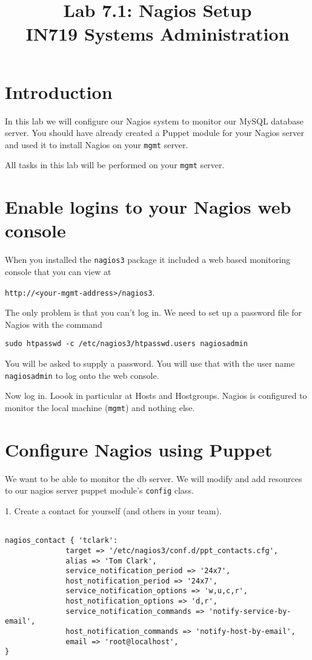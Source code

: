 \documentclass{article}         %
\title{Lab 7.1:  Nagios Setup\\ IN719 Systems Administration}
\date{}                                                 %
\begin{document}
\maketitle

\section*{Introduction}
In this lab we will configure our Nagios system to monitor our MySQL
database server.  You should have already created a Puppet module
for your Nagios server and used it to install Nagios on your 
\texttt{mgmt} server.

All tasks in this lab will be performed on your \texttt{mgmt} server.

\section{Enable logins to your Nagios web console}
When you installed the \texttt{nagios3} package it included a web based 
monitoring console that you can view at

\texttt{http://<your-mgmt-address>/nagios3}.

The only problem is that you can't log in.  We need to set up a password file
for Nagios with the command

 \texttt{sudo htpasswd -c /etc/nagios3/htpasswd.users nagiosadmin}

You will be asked to supply a password.  You will use that with the 
user name \texttt{nagiosadmin} to log onto the web console.

Now log in.  Loook in particular at Hosts and Hostgroups.  Nagios is configured
to monitor the local machine (\texttt{mgmt}) and nothing else.

\section{Configure Nagios using Puppet}

We want to be able to monitor the db server.  We will modify and add resources to
our nagios server puppet module's \texttt{config} class. 

1.  Create a contact for yourself (and others in your team).

\begin{verbatim}

nagios_contact { 'tclark':
              target => '/etc/nagios3/conf.d/ppt_contacts.cfg',
              alias => 'Tom Clark',
              service_notification_period => '24x7',
              host_notification_period => '24x7',
              service_notification_options => 'w,u,c,r',
              host_notification_options => 'd,r',
              service_notification_commands => 'notify-service-by-email',
              host_notification_commands => 'notify-host-by-email',
              email => 'root@localhost',
}

  \end{verbatim}
\end{document}
